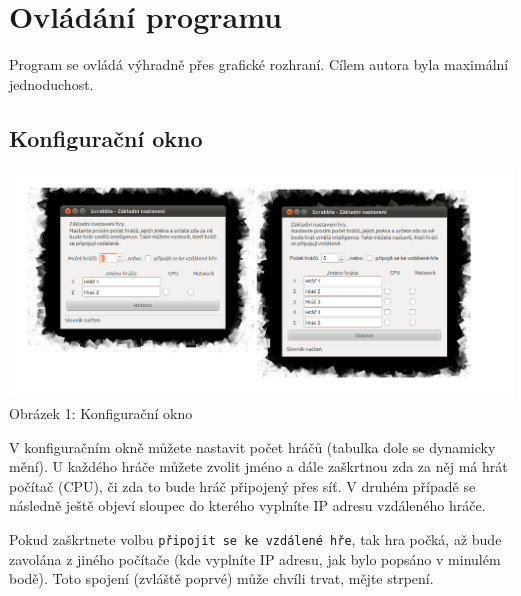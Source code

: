 \documentclass[a4paper]{article}
\begin{document}
\section{Ovládání programu}
Program se ovládá výhradně přes grafické rozhraní. Cílem autora byla maximální jednoduchost.
\subsection{Konfigurační okno}
\begin{center}
\includegraphics[scale=1.2]{configWin.png}
Obrázek 1: Konfigurační okno
\end{center}
V konfiguračním okně můžete nastavit počet hráčů (tabulka dole se dynamicky mění). U každého hráče můžete zvolit jméno a dále zaškrtnou zda za něj má hrát počítač (CPU), či zda to bude hráč připojený přes síť. V druhém případě se následně ještě objeví sloupec do kterého vyplníte IP adresu vzdáleného hráče. 

Pokud zaškrtnete volbu \texttt{připojit se ke vzdálené hře}, tak hra počká, až bude zavolána z jiného počítače (kde vyplníte IP adresu, jak bylo popsáno v minulém bodě). Toto spojení (zvláště poprvé) může chvíli trvat, mějte strpení.
\end{document}
